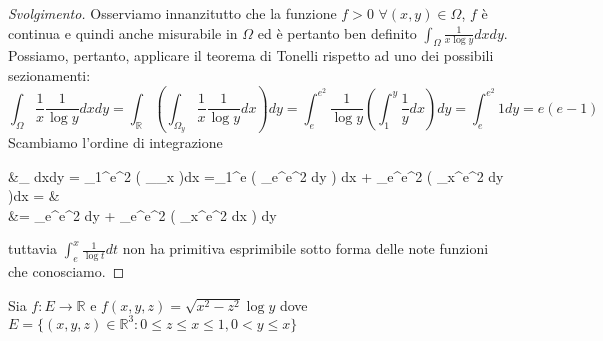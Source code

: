 \begin{proof}[Svolgimento]
	Osserviamo innanzitutto che la funzione $f > 0 \, \, \forall (x, y) \in \Omega$, $f$ è continua e quindi anche misurabile in $\Omega$ ed è pertanto ben definito $\int_\Omega \frac{1}{x\log{y}}dxdy$. Possiamo, pertanto, applicare il teorema di Tonelli rispetto ad uno dei possibili sezionamenti:
	$$
	\int_\Omega \frac{1}{x} \frac{1}{\log{y}}dxdy = \int_\mathbb{R} \left( \int_{\Omega_y} \frac{1}{x}\frac{1}{\log{y}} dx \right)dy = \int_e^{e^2} \frac{1}{\log{y}} \left( \int_1^y \frac{1}{y} dx \right) dy = \int_e^{e^2} 1dy = e(e-1)
	$$
	Scambiamo l'ordine di integrazione
	\begin{flalign*}
	&\int_\Omega {} dxdy = \int_1^{e^2}  \left( \int_{\Omega_x}  \right)dx =\int_1^e  \left( \int_e^{e^2} dy \right) dx + \int_e^{e^2}  \left( \int_x^{e^2} dy \right)dx = & \\
	&= \int_e^{e^2} dy + \int_e^{e^2} \left( \int_x^{e^2} dx \right) dy
	\end{flalign*}
	tuttavia $\int_e^x \frac{1}{\log{t}}dt$ non ha primitiva esprimibile sotto forma delle note funzioni che conosciamo. 
\end{proof}
\begin{exercise}
	Sia $f: E \to \mathbb{R}$ e $f(x, y, z) = \sqrt{x^2 - z^2}\log{y}$ dove $E = \{(x, y, z) \in \mathbb{R}^3 : 0 \leq z \leq x \leq 1, 0 < y \leq x \}$
\end{exercise}
